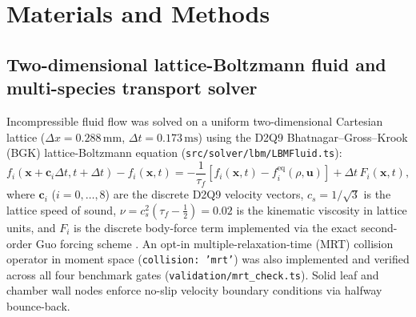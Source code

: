 \documentclass[preprint,11pt,numbers,sort&compress]{elsarticle}
\begin{document}
\section{Materials and Methods}\label{sec:methods}

\subsection{Two-dimensional lattice-Boltzmann fluid and multi-species transport solver}

Incompressible fluid flow was solved on a uniform two-dimensional Cartesian lattice ($\Delta x = 0.288\,\mathrm{mm}$, $\Delta t = 0.173\,\mathrm{ms}$) using the D2Q9 Bhatnagar--Gross--Krook (BGK) lattice-Boltzmann equation (\texttt{src/solver/lbm/LBMFluid.ts}):
\begin{equation}
f_i(\mathbf{x}+\mathbf{c}_i\Delta t, t+\Delta t) - f_i(\mathbf{x},t) = -\frac{1}{\tau_f}\left[f_i(\mathbf{x},t) - f_i^{\mathrm{eq}}(\rho,\mathbf{u})\right] + \Delta t\,F_i(\mathbf{x},t),
\label{eq:lbm_bgk}
\end{equation}
where $\mathbf{c}_i$ ($i=0,\dots,8$) are the discrete D2Q9 velocity vectors, $c_s = 1/\sqrt{3}$ is the lattice speed of sound, $\nu = c_s^2(\tau_f - \tfrac{1}{2}) = 0.02$ is the kinematic viscosity in lattice units, and $F_i$ is the discrete body-force term implemented via the exact second-order Guo forcing scheme \citep{guo2002}. An opt-in multiple-relaxation-time (MRT) collision operator in moment space \citep{lallemand2000} (\texttt{collision: 'mrt'}) was also implemented and verified across all four benchmark gates (\texttt{validation/mrt\_check.ts}). Solid leaf and chamber wall nodes enforce no-slip velocity boundary conditions via halfway bounce-back.
\end{document}
